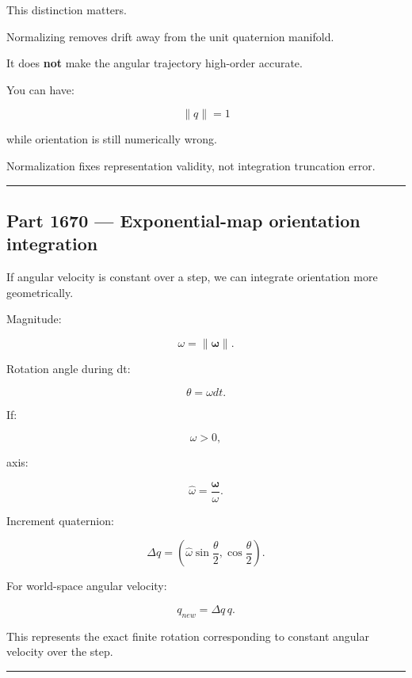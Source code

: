 \hypertarget{06-engine-ii-ch037-normalization-is-not-a-fix-for-poor-integration}{}

This distinction matters.

Normalizing removes drift away from the unit quaternion manifold.

It does \textbf{not} make the angular trajectory high-order accurate.

You can have:

\[
\|q\|=1
\]

while orientation is still numerically wrong.

Normalization fixes representation validity, not integration truncation error.

\begin{center}\rule{0.5\linewidth}{0.5pt}\end{center}

\subsection{Part 1670 --- Exponential-map orientation integration}\label{06-engine-ii-ch037-part-1670-exponential-map-orientation-integration}

\hypertarget{06-engine-ii-ch037-part-1670-exponential-map-orientation-integration}{}

If angular velocity is constant over a step, we can integrate orientation more geometrically.

Magnitude:

\[
\omega=
\|\boldsymbol\omega\|.
\]

Rotation angle during dt:

\[
\theta
=
\omega dt.
\]

If:

\[
\omega>0,
\]

axis:

\[
\hat\omega
=
\frac{\boldsymbol\omega}{\omega}.
\]

Increment quaternion:

\[
\boxed{
\Delta q
=
\left(
\hat\omega
\sin\frac{\theta}{2},
\cos\frac{\theta}{2}
\right).
}
\]

For world-space angular velocity:

\[
\boxed{
q_{new}
=
\Delta q\,q.
}
\]

This represents the exact finite rotation corresponding to constant angular velocity over the step.

\begin{center}\rule{0.5\linewidth}{0.5pt}\end{center}

